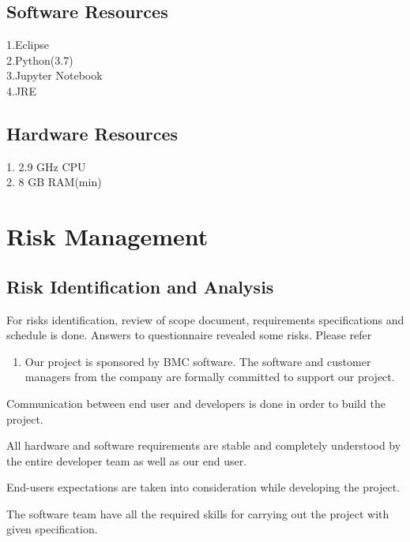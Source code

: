 \documentclass[oneside,a4paper,12pt]{book}
\begin{document}
\subsection{Software Resources}
1.Eclipse \\
2.Python(3.7) \\
3.Jupyter Notebook\\
4.JRE\\
\subsection{Hardware Resources}
1. 2.9 GHz CPU \\
2. 8 GB RAM(min) \\ 
\newpage
\section{Risk Management}

\subsection{Risk Identification and Analysis}

\begin{justify}
For risks identification, review of scope document, requirements specifications and schedule is done. Answers to questionnaire revealed some risks. Please refer \setlength{\parskip}{0.0pt}
\begin{enumerate}
	\item Our project is sponsored by BMC software. The software and customer managers from the company are formally committed to support our project. 
\end{enumerate}
\end{justify}\par

	\item Communication between end user and developers is done in order to build the project.\par

	\item  All hardware and software requirements are stable and completely understood by the entire developer team as well as our end user.\par

	\item End-users expectations are taken into consideration while developing the project. \par

	\item The software team have all the required skills for carrying out the project with given specification.\par
\end{document}
